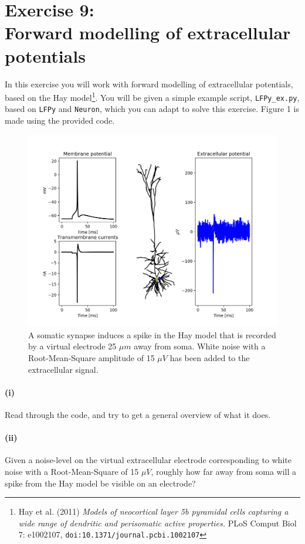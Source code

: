 \documentclass[a4paper,12pt]{article}
\begin{document}
\section*{Exercise 9:\\Forward modelling of extracellular potentials}

In this exercise you will work with forward modelling of extracellular potentials, based on the Hay model\footnote{Hay et al. (2011) {\it Models of neocortical layer 5b pyramidal cells capturing a wide range of dendritic and perisomatic active properties.} PLoS Comput Biol 7: e1002107, \texttt{doi:10.1371/journal.pcbi.1002107}}. You will be given a simple example script, \texttt{LFPy\_ex.py}, based on \texttt{LFPy} and \texttt{Neuron}, which you can adapt to solve this exercise. Figure 1 is made using the provided code.

\begin{figure}[hb]
\centering
\includegraphics[width=12cm]{figure_127}
\caption{A somatic synapse induces a spike in the Hay model that is recorded by a virtual electrode 25 $\mu m$ away from soma. White noise with a Root-Mean-Square amplitude of 15 $\mu V$ has been added to the extracellular signal.}
\end{figure}

\paragraph{(i)} Read through the code, and try to get a general overview of what it does. 

\paragraph{(ii)} Given a noise-level on the virtual extracellular electrode corresponding to white noise with a Root-Mean-Square of 15 $\mu V$, roughly how far away from soma will a spike from the Hay model be visible on an electrode?
\end{document}
